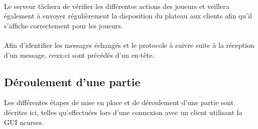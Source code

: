 \documentclass[10pt, a4paper]{article}
\begin{document}
\paragraph{}Le serveur tâchera de vérifier les différentes actions des joueurs et veillera également à envoyer régulièrement la disposition du plateau aux clients afin qu'il s'affiche correctement pour les joueurs.
\paragraph{}Afin d'identifier les messages échangés et le protocole à suivre suite à la réception d'un message, ceux-ci sont précédés d'un en-tête.

\subsection{Déroulement d'une partie}

Les différentes étapes de mise en place et de déroulement d'une partie sont décrites ici, telles qu'effectuées lors d'une connexion avec un client utilisant la GUI ncurses.
\end{document}
